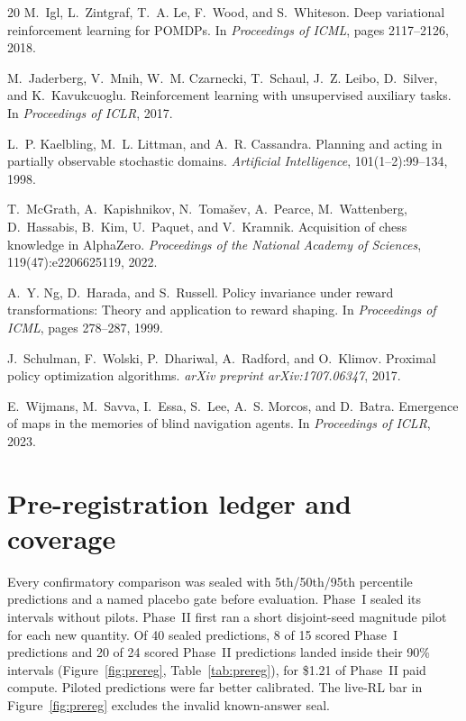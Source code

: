\documentclass{article}
\begin{document}
\begin{thebibliography}{20}
M.~Igl, L.~Zintgraf, T.~A. Le, F.~Wood, and S.~Whiteson.
\newblock Deep variational reinforcement learning for POMDPs.
\newblock In \emph{Proceedings of ICML}, pages 2117--2126, 2018.

M.~Jaderberg, V.~Mnih, W.~M. Czarnecki, T.~Schaul, J.~Z. Leibo, D.~Silver, and K.~Kavukcuoglu.
\newblock Reinforcement learning with unsupervised auxiliary tasks.
\newblock In \emph{Proceedings of ICLR}, 2017.

L.~P. Kaelbling, M.~L. Littman, and A.~R. Cassandra.
\newblock Planning and acting in partially observable stochastic domains.
\newblock \emph{Artificial Intelligence}, 101(1--2):99--134, 1998.

T.~McGrath, A.~Kapishnikov, N.~Toma\v{s}ev, A.~Pearce, M.~Wattenberg, D.~Hassabis, B.~Kim, U.~Paquet, and V.~Kramnik.
\newblock Acquisition of chess knowledge in AlphaZero.
\newblock \emph{Proceedings of the National Academy of Sciences}, 119(47):e2206625119, 2022.

A.~Y. Ng, D.~Harada, and S.~Russell.
\newblock Policy invariance under reward transformations: Theory and application to reward shaping.
\newblock In \emph{Proceedings of ICML}, pages 278--287, 1999.

J.~Schulman, F.~Wolski, P.~Dhariwal, A.~Radford, and O.~Klimov.
\newblock Proximal policy optimization algorithms.
\newblock \emph{arXiv preprint arXiv:1707.06347}, 2017.

E.~Wijmans, M.~Savva, I.~Essa, S.~Lee, A.~S. Morcos, and D.~Batra.
\newblock Emergence of maps in the memories of blind navigation agents.
\newblock In \emph{Proceedings of ICLR}, 2023.

\end{thebibliography}

\clearpage
\appendix
\normalsize

\section{Pre-registration ledger and coverage}
\label{app:prereg}

Every confirmatory comparison was sealed with 5th/50th/95th percentile predictions and a named placebo gate before evaluation. Phase~I sealed its intervals without pilots. Phase~II first ran a short disjoint-seed magnitude pilot for each new quantity. Of 40 sealed predictions, 8 of 15 scored Phase~I predictions and 20 of 24 scored Phase~II predictions landed inside their 90\% intervals (Figure~\ref{fig:prereg}, Table~\ref{tab:prereg}), for \$1.21 of Phase~II paid compute. Piloted predictions were far better calibrated. The live-RL bar in Figure~\ref{fig:prereg} excludes the invalid known-answer seal.
\end{document}

